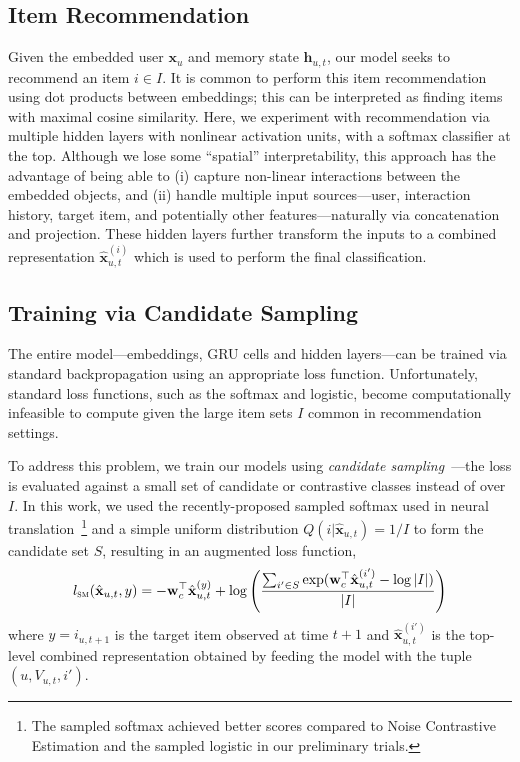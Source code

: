 \documentclass{sig-alternate-05-2015}
\newcommand{\mat}[1]{\mathbf{#1}}
\newcommand{\hatmat}[1]{\hat{\mathbf{#1}}}
\begin{document}
\subsection{Item Recommendation}
Given the embedded user $\mat{x}_u$ and memory state $\mat{h}_{u,t}$, our model seeks to recommend an item $i \in I$. It is common to perform this item recommendation using dot products between embeddings; this can be interpreted as finding items with maximal cosine similarity. Here, we experiment with recommendation via multiple hidden layers with nonlinear activation units, with a softmax classifier at the top. Although we lose some ``spatial'' interpretability, this approach has the advantage of being able to (i) capture non-linear interactions between the embedded objects, and (ii) handle multiple input sources---user, interaction history, target item, and potentially other features---naturally via concatenation and projection. These hidden layers further transform the inputs to a combined representation $\hatmat{x}^{(i)}_{u,t}$ which is used to perform the final classification.
   
\subsection{Training via Candidate Sampling}
\label{sec:training}
The entire model---embeddings, GRU cells and hidden layers---can be trained via standard backpropagation using an appropriate loss function. Unfortunately, standard loss functions, such as the softmax and logistic, become computationally infeasible to compute given the large item sets $I$ common in recommendation settings.

To address this problem, we train our models using \emph{candidate sampling}~\cite{TFCandidateSampling}---the loss is evaluated against a small set of candidate or contrastive classes instead of over $I$. In  this work, we used the recently-proposed sampled softmax used in neural translation~\cite{Jean2015}\footnote{The sampled softmax achieved better scores compared to Noise Contrastive Estimation and the sampled logistic in our preliminary trials.} and a simple uniform distribution $Q(i|\hatmat{x}_{u,t}) = 1/I$ to form the candidate set $S$, resulting in an augmented loss function,
\begin{align}
	l_{\textsc{sm}}(\hatmat{x}_{u,t}, y) = -\mat{w}_c^{\top}\hatmat{x}^{(y)}_{u,t} + \log \left( \frac{\sum_{i'\in S} \exp(\mat{w}_c^{\top}\hatmat{x}^{(i')}_{u,t} - \log|I|)}{|I|}  \right) 
\end{align}
where $y = i_{u,t+1}$ is the target item observed at time $t+1$ and $\hatmat{x}_{u,t}^{(i')}$ is the top-level combined representation obtained by feeding the model with the tuple $(u, V_{u,t}, i')$.
\end{document}

